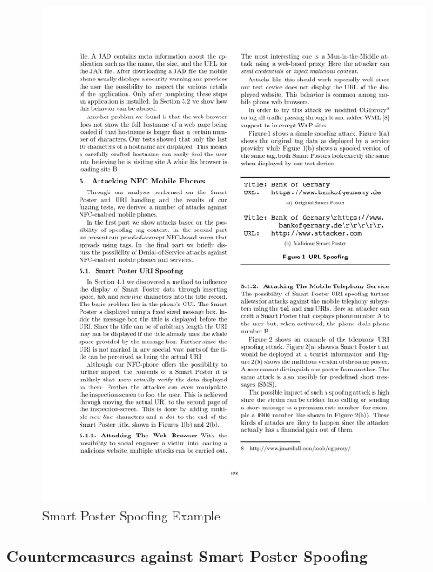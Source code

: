 \documentclass[12pt,a4paper]{article}
\begin{document}
\begin{figure}
\begin{center}
\includegraphics{img/smart_poster_spoofing}
\caption{\footnotesize{Smart Poster Spoofing Example\cite{DBLP:conf/IEEEares/Mulliner09}}}
\label{img_smart_poster_spoofing}
\end{center}
\end{figure}

\subsubsection{Countermeasures against Smart Poster Spoofing}
\end{document}
